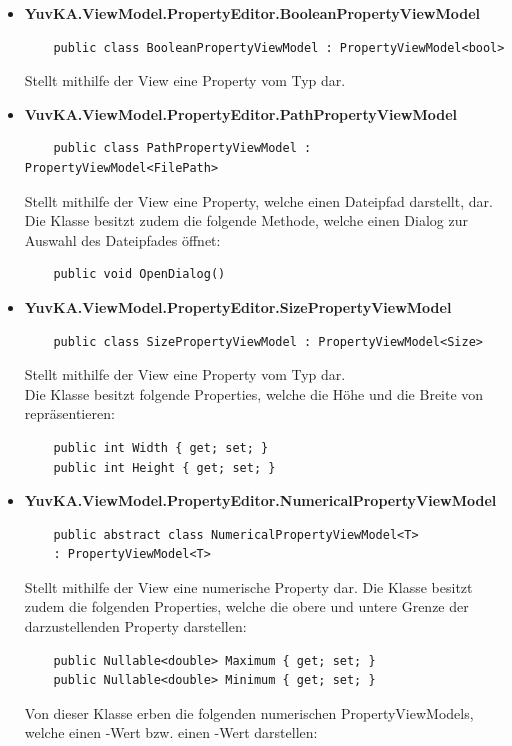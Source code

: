 \begin{itemize}

\item{\textbf{YuvKA.ViewModel.PropertyEditor.BooleanPropertyViewModel}}
	\begin{verbatim}
	public class BooleanPropertyViewModel : PropertyViewModel<bool>
	\end{verbatim}
	Stellt mithilfe der View eine Property vom Typ  dar.

\item{\textbf{VuvKA.ViewModel.PropertyEditor.PathPropertyViewModel}}
	\begin{verbatim}
	public class PathPropertyViewModel : PropertyViewModel<FilePath>
	\end{verbatim}
	Stellt mithilfe der View eine Property, welche einen Dateipfad darstellt, dar.\\
	Die Klasse besitzt zudem die folgende Methode, welche einen Dialog zur Auswahl des Dateipfades öffnet:
	\begin{verbatim}
	public void OpenDialog()
	\end{verbatim}

\item{\textbf{YuvKA.ViewModel.PropertyEditor.SizePropertyViewModel}}
	\begin{verbatim}
	public class SizePropertyViewModel : PropertyViewModel<Size>
	\end{verbatim}
	Stellt mithilfe der View eine Property vom Typ  dar.\\
	Die Klasse besitzt folgende Properties, welche die Höhe und die Breite von  repräsentieren:
	\begin{verbatim}
	public int Width { get; set; }
	public int Height { get; set; } 
	\end{verbatim}

\item{\textbf{YuvKA.ViewModel.PropertyEditor.NumericalPropertyViewModel}}
	\begin{verbatim}
	public abstract class NumericalPropertyViewModel<T> 
	: PropertyViewModel<T>
	\end{verbatim}
	Stellt mithilfe der View eine numerische Property dar. Die Klasse besitzt zudem die folgenden Properties, welche die obere und untere Grenze der darzustellenden Property darstellen:
	\begin{verbatim}
	public Nullable<double> Maximum { get; set; }
	public Nullable<double> Minimum { get; set; }
	\end{verbatim}
	Von dieser Klasse erben die folgenden numerischen PropertyViewModels, welche einen -Wert bzw. einen -Wert darstellen:


\end{itemize}
